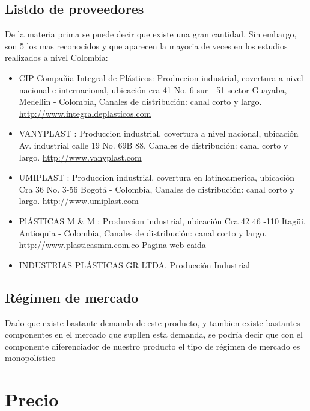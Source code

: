 \documentclass[letterpaper,12pt]{scrreprt}
\begin{document}
    \section{Listdo de proveedores}
    De la materia prima se puede decir que existe una gran cantidad. Sin embargo, son 5 los mas reconocidos y que aparecen la mayoria de veces en los estudios realizados a nivel Colombia:
    \begin{itemize}
        \item CIP Compañia Integral de Plásticos: Produccion industrial, covertura a nivel nacional e internacional, ubicación cra 41 No. 6 sur - 51 sector Guayaba, Medellin - Colombia, Canales de distribución: canal corto y largo. \url{http://www.integraldeplasticos.com}
        
        \item VANYPLAST : Produccion industrial, covertura a nivel nacional, ubicación Av. industrial calle 19 No. 69B 88, Canales de distribución: canal corto y largo. \url{http://www.vanyplast.com}

        \item UMIPLAST : Produccion industrial, covertura en latinoamerica, ubicación Cra 36 No. 3-56 Bogotá - Colombia, Canales de distribución: canal corto y largo. \url{http://www.umiplast.com}
        
        \item PlÁSTICAS M \& M  : Produccion industrial, ubicación Cra 42 46 -110 Itagüi, Antioquia - Colombia, Canales de distribución: canal corto y largo. \url{http://www.plasticasmm.com.co} Pagina web caida

        \item INDUSTRIAS PLÁSTICAS GR LTDA. Producción Industrial

    \end{itemize}
    
    \section{Régimen de mercado}
    Dado que existe bastante demanda de este producto, y tambien existe bastantes componentes en el mercado que supllen esta demanda, se podría decir que con el componente diferenciador de nuestro producto el tipo de régimen de mercado es monopolístico
    
    
    
\chapter{Precio}
\end{document}
